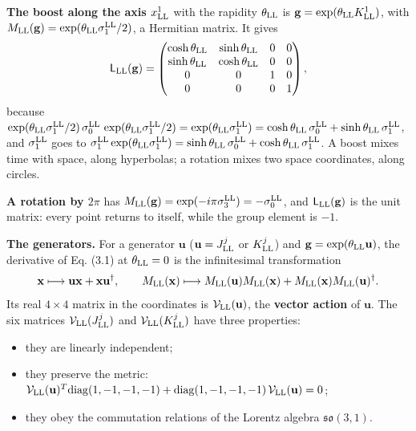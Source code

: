 \documentclass[
  10pt,
]{article}
\providecommand{\tightlist}{%
  \setlength{\itemsep}{0pt}\setlength{\parskip}{0pt}}
\begin{document}
\textbf{The boost along the axis \(x^1_{\rm LL}\)} with the rapidity
\(\theta_{\rm LL}\) is \(\mathbf g=\exp(\theta_{\rm LL}K^1_{\rm LL})\),
with \(M_{\rm LL}(\mathbf g)=\exp(\theta_{\rm LL}\sigma^{\rm LL}_1/2)\),
a Hermitian matrix. It gives
\[\mathsf L_{\rm LL}(\mathbf g)=\begin{pmatrix}\cosh\theta_{\rm LL}&\sinh\theta_{\rm LL}&0&0\\\sinh\theta_{\rm LL}&\cosh\theta_{\rm LL}&0&0\\0&0&1&0\\0&0&0&1\end{pmatrix},\]
because
\(\exp(\theta_{\rm LL}\sigma^{\rm LL}_1/2)\,\sigma^{\rm LL}_0\,\exp(\theta_{\rm LL}\sigma^{\rm LL}_1/2)=\exp(\theta_{\rm LL}\sigma^{\rm LL}_1)=\cosh\theta_{\rm LL}\,\sigma^{\rm LL}_0+\sinh\theta_{\rm LL}\,\sigma^{\rm LL}_1\),
and \(\sigma^{\rm LL}_1\) goes to
\(\sigma^{\rm LL}_1\exp(\theta_{\rm LL}\sigma^{\rm LL}_1)=\sinh\theta_{\rm LL}\,\sigma^{\rm LL}_0+\cosh\theta_{\rm LL}\,\sigma^{\rm LL}_1\).
A boost mixes time with space, along hyperbolas; a rotation mixes two
space coordinates, along circles.

\textbf{A rotation by \(2\pi\)} has
\(M_{\rm LL}(\mathbf g)=\exp(-i\pi\sigma^{\rm LL}_3)=-\sigma^{\rm LL}_0\),
and \(\mathsf L_{\rm LL}(\mathbf g)\) is the unit matrix: every point
returns to itself, while the group element is \(-1\).

\textbf{The generators.} For a generator \(\mathbf u\)
(\(\mathbf u=J^j_{\rm LL}\) or \(K^j_{\rm LL}\)) and
\(\mathbf g=\exp(\theta_{\rm LL}\mathbf u)\), the derivative of Eq.
(3.1) at \(\theta_{\rm LL}=0\) is the infinitesimal transformation
\[\mathbf x\longmapsto\mathbf u\mathbf x+\mathbf x\mathbf u^\dagger,\qquad M_{\rm LL}(\mathbf x)\longmapsto M_{\rm LL}(\mathbf u)M_{\rm LL}(\mathbf x)+M_{\rm LL}(\mathbf x)M_{\rm LL}(\mathbf u)^\dagger .\]
Its real \(4\times4\) matrix in the coordinates is
\(\mathcal V_{\rm LL}(\mathbf u)\), the \textbf{vector action} of
\(\mathbf u\). The six matrices \(\mathcal V_{\rm LL}(J^j_{\rm LL})\)
and \(\mathcal V_{\rm LL}(K^j_{\rm LL})\) have three properties:

\begin{itemize}
\tightlist
\item
  they are linearly independent;
\item
  they preserve the metric:
  \(\mathcal V_{\rm LL}(\mathbf u)^T\mathrm{diag}(1,-1,-1,-1)+\mathrm{diag}(1,-1,-1,-1)\,\mathcal V_{\rm LL}(\mathbf u)=0\);
\item
  they obey the commutation relations of the Lorentz algebra
  \(\mathfrak{so}(3,1)\).
\end{itemize}
\end{document}
